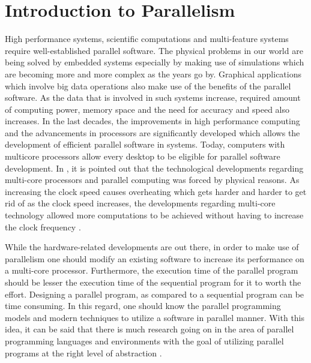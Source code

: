 \section{Introduction to Parallelism} %
High performance systems, scientific computations and multi-feature systems require well-established parallel software. The physical problems in our world are being solved by embedded systems especially by making use of simulations which are becoming more and more complex as the years go by. Graphical applications which involve big data operations also make use of the benefits of the parallel software. As the data that is involved in such systems increase, required amount of computing power, memory space and the need for accuracy and speed also increases. In the last decades, the improvements in high performance computing and the advancements in processors are significantly developed which allows the development of efficient parallel software in systems. Today, computers with multicore processors allow every desktop to be eligible for parallel software development. In \cite{springerparallel}, it is pointed out that the technological developments regarding multi-core processors and parallel computing was forced by physical reasons. As increasing the clock speed causes overheating which gets harder and harder to get rid of as the clock speed increases, the developments regarding multi-core technology allowed more computations to be achieved without having to increase the clock frequency \cite{springerparallel}.

While the hardware-related developments are out there, in order to make use of parallelism one should modify an existing software to increase its performance on a multi-core processor. Furthermore, the execution time of the parallel program should be lesser the execution time of the sequential program for it to worth the effort. Designing a parallel program, as compared to a sequential program can be time consuming. In this regard, one should know the parallel programming models and modern techniques to utilize a software in parallel manner. With this idea, it can be said that there is much research going on in the area of parallel programming languages and environments with the goal of utilizing parallel programs at the right level of abstraction \cite{springerparallel}.

